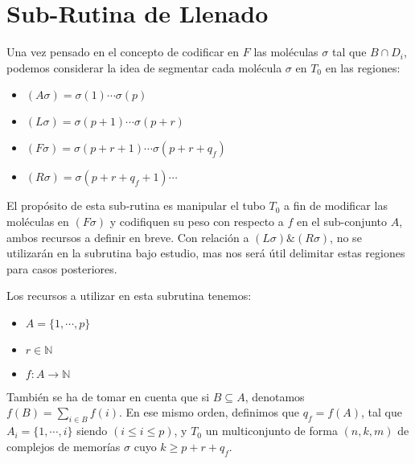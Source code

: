 \documentclass[12pt, letterpaper, twoside]{article}
\begin{document}
    \section{Sub-Rutina de Llenado}
    \par Una vez pensado en el concepto de codificar en $F$ las moléculas $\sigma$ tal que $B\cap D_i$, podemos considerar la idea de segmentar cada molécula $\sigma$ en $T_0$ en las regiones:
    \begin{itemize}
        
        
        \item $(A\sigma )=\sigma (1)\cdots\sigma (p)$
        \item $(L\sigma )=\sigma (p+1)\cdots\sigma (p+r)$
        \item $(F\sigma)=\sigma(p+r+1)\cdots\sigma(p+r+q_f)$
        \item $(R\sigma)=\sigma(p+r+q_f+1)\cdots$
    \end{itemize} 
   \par El propósito de esta sub-rutina es manipular el tubo $T_0$ a fin de modificar las moléculas en $(F\sigma)$ y codifiquen su peso con respecto a $f$ en el sub-conjunto $A$, ambos recursos a definir en breve. Con relación a $(L\sigma) \& (R\sigma)$, no se utilizarán en la subrutina bajo estudio, mas nos será útil delimitar estas regiones para casos posteriores.
   \par Los recursos a utilizar en esta subrutina tenemos:\\
   \begin{itemize}
       \item $A=\{1,\cdots,p\}$
       \item $r \in \mathbb{N}$
       \item $f:A\rightarrow\mathbb{N}$
   \end{itemize}
   \par También se ha de tomar en cuenta que si $B\subseteq A$, denotamos $f(B)=\sum_{i\in B}f(i)$. En ese mismo orden, definimos que $q_f=f(A)$, tal que $A_i=\{1,\cdots,i\}$ siendo $(i\leq i\leq p)$, y $T_0$ un multiconjunto de forma $(n,k,m)$ de complejos de memorías $\sigma$ cuyo $k\geq p+r+q_f$.
\end{document}
